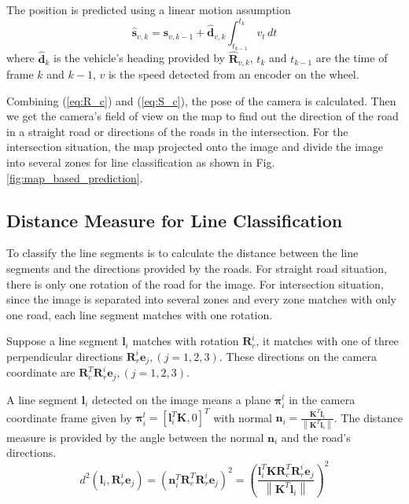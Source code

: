 \documentclass[letterpaper, 10 pt, conference]{ieeeconf}  %
\begin{document}
The position is predicted using a linear motion assumption
\begin{equation}
\hat{\mathbf{s}}_{v,k}= \mathbf{s}_{v,k-1} + \hat{\mathbf{d}}_{v,k} \int_{t_{k-1}}^{t_k}{v_t}\,dt
\end{equation}
where $\hat{\mathbf{d}}_k$ is the vehicle's heading provided by $\hat{\mathbf{R}}_{v,k}$, $t_k$ and $t_{k-1}$ are the time of frame $k$ and $k-1$, $v$ is the speed detected from an encoder on the wheel.

Combining (\ref{eq:R_c}) and (\ref{eq:S_c}), the pose of the camera is calculated. Then we get the camera's field of view on the map to find out the direction of the road in a straight road or directions of the roads in the intersection. For the intersection situation, the map projected onto the image and divide the image into several zones for line classification as shown in Fig. \ref{fig:map_based_prediction}.

\subsection{Distance Measure for Line Classification}
To classify the line segments is to calculate the distance between the line segments and the directions provided by the roads. For straight road situation, there is only one rotation of the road for the image. For intersection situation, since the image is separated into several zones and every zone matches with only one road, each line segment matches with one rotation.

Suppose a line segment $\mathbf{l}_i$ matches with rotation $\mathbf{R}_r^i$, it matches with one of three perpendicular directions $\mathbf{R}_r^i\mathbf{e}_j,(j=1,2,3)$. These directions on the camera coordinate are $\mathbf{R}_c^T\mathbf{R}_r^i\mathbf{e}_j,(j=1,2,3)$.

A line segment $\mathbf{l}_i$ detected on the image means a plane $\mathbf{\pi}_i^l$ in the camera coordinate frame given by $\mathbf{\pi}_i^l = \left[\mathbf{l}_i^T\mathbf{K}, 0\right]^T$ with normal $\mathbf{n}_i=\frac{\mathbf{K}^T\mathbf{l}_i}{\left\|\mathbf{K}^T\mathbf{l}_i\right\|}$. The distance measure is provided by the angle between the normal $\mathbf{n}_i$ and the road's directions.
\begin{equation}
d^2(\mathbf{l}_i,\mathbf{R}_r^i\mathbf{e}_j) = {\left(\mathbf{n}_i^T\mathbf{R}_c^T\mathbf{R}_r^i\mathbf{e}_j\right)}^2 = { \left(\frac  {\mathbf{l}_i^T\mathbf{K}\mathbf{R}_c^T\mathbf{R}_r^i\mathbf{e}_j}
                {\left\|\mathbf{K}^T\mathbf{l}_i\right\|}
    \right)
  }^2
\label{eq:d_3d}
\end{equation}
\end{document}
